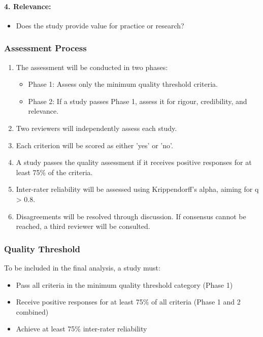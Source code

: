\documentclass[a4paper,12pt]{article}
\begin{document}
\paragraph{4. Relevance:}
\begin{itemize}
    \item Does the study provide value for practice or research?
\end{itemize}

\subsubsection{Assessment Process}
\begin{enumerate}
    \item The assessment will be conducted in two phases:
    \begin{itemize}
        \item Phase 1: Assess only the minimum quality threshold criteria.
        \item Phase 2: If a study passes Phase 1, assess it for rigour, credibility, and relevance.
    \end{itemize}
    \item Two reviewers will independently assess each study.
    \item Each criterion will be scored as either 'yes' or 'no'.
    \item A study passes the quality assessment if it receives positive responses for at least 75\% of the criteria.
    \item Inter-rater reliability will be assessed using Krippendorff's alpha, aiming for q > 0.8.
    \item Disagreements will be resolved through discussion. If consensus cannot be reached, a third reviewer will be consulted.
\end{enumerate}

\subsubsection{Quality Threshold}
To be included in the final analysis, a study must:
\begin{itemize}
    \item Pass all criteria in the minimum quality threshold category (Phase 1)
    \item Receive positive responses for at least 75\% of all criteria (Phase 1 and 2 combined)
    \item Achieve at least 75\% inter-rater reliability
\end{itemize}
\end{document}
